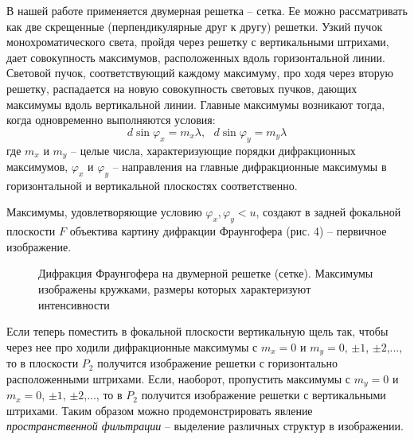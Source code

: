 \documentclass[14pt]{article}
\begin{document}
В нашей работе применяется двумерная решетка -- сетка. Ее можно рассматривать
как две скрещенные (перпендикулярные друг к другу) решетки. Узкий пучок монохроматического света,
пройдя через решетку с вертикальными штрихами, дает совокупность максимумов, расположенных
вдоль горизонтальной линии. Световой пучок, соответствующий каждому максимуму, про
ходя через вторую решетку, распадается на новую совокупность световых пучков, дающих максимумы
вдоль вертикальной линии. Главные максимумы возникают тогда, когда одновременно
выполняются условия:
\begin{equation}
	d\sin\varphi_x = m_x\lambda,~~~d\sin\varphi_y = m_y\lambda
\end{equation}
\noindent где $m_x$ и $m_y$ -- целые числа, характеризующие порядки дифракционных
максимумов, $\varphi_x$ и $\varphi_y$ -- направления на главные дифракционные максимумы
в горизонтальной и вертикальной плоскостях соответственно.

Максимумы, удовлетворяющие условию $\varphi_x, \varphi_y < u$, создают в задней фокальной плоскости
$F$ объектива картину дифракции Фраунгофера (рис. 4) -- первичное изображение.

\begin{figure}[h!]
	\caption{Дифракция Фраунгофера на двумерной решетке (сетке). Максимумы изображены кружками, размеры которых характеризуют интенсивности}
	\label{fig:image}
\end{figure}

Если теперь поместить в фокальной плоскости вертикальную щель так, чтобы
через нее про ходили дифракционные максимумы
с $m_x = 0$ и $m_y = 0$, $\pm 1$, $\pm 2$,..., то в плоскости
$P_2$ получится изображение решетки с горизонтально расположенными
штрихами. Если, наоборот, пропустить максимумы с $m_y = 0$ и $m_x = 0$, $\pm 1$, $\pm 2$,...,
то в $P_2$ получится изображение решетки с вертикальными штрихами.
Таким образом можно продемонстрировать явление \textsl{пространственной фильтрации} -- выделение
различных структур в изображении.
\end{document}
